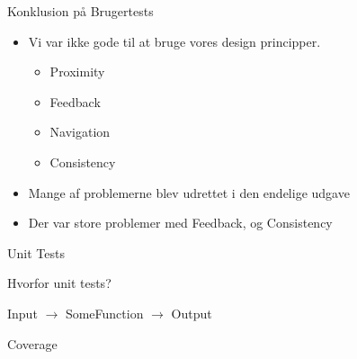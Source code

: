 \begin{frame}{Konklusion på Brugertests}	
	
\begin{itemize}
	\item Vi var ikke gode til at bruge vores design principper.
		\begin{itemize}
			\item Proximity
			\item Feedback
			\item Navigation
			\item Consistency
		\end{itemize}
	\item Mange af problemerne blev udrettet i den endelige udgave
	\item Der var store problemer med Feedback, og Consistency
\end{itemize}
  
\end{frame}


\begin{frame}{Unit Tests}

Hvorfor unit tests?

Input $\rightarrow$ SomeFunction $\rightarrow$  Output

Coverage

\end{frame}
